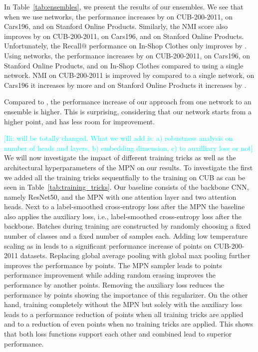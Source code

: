 \documentclass{article}
\newcommand{\ili}[1]{{\textcolor{cyan}{[Ili: #1]}}}
\begin{document}
\iffalse
CUB-200-2011 & 72.2 & 74.3 & 73.1 & 74.4 \\
Cars196 & 90.9 & 74.9 & 91.5 & 75.4 \\
Stanford Online Products & 81.8 & 92.7 & 82.1 & 92.8 \\
In-Shop Clothes & 92.9 & - & 93.4 &  \\
\fi 
In Table~\ref{tab:ensembles}, we present the results of our ensembles. We see that when we use  networks, the performance increases by  on CUB-200-2011,  on Cars196, and  on Stanford Online Products.  Similarly, the NMI score also improves by  on CUB-200-2011,  on Cars196, and  on Stanford Online Products. Unfortunately, the Recall@ performance on In-Shop Clothes only improves by .
Using  networks, the performance increases by  on CUB-200-2011,  on Cars196,  on Stanford Online Products, and  on In-Shop Clothes compared to using a single network. NMI on CUB-200-2011 is improved by  compared to a single network, on Cars196 it increases by  more and on Stanford Online Products it increases by .

Compared to \cite{DBLP:conf/eccv/GrLoss}, the performance increase of our approach from one network to an ensemble is higher. This is surprising, considering that our network starts from a higher point, and has less room for improvement.
\noindent

\iffalse
\ili{will be totally changed. What we will add is: a) robustness analysis on number of heads and layers, b) embedding dimension, c) to auxilliary loss or not}
We will now investigate the impact of different training tricks as well as the architectural hyperparameters of the MPN on our results. To investigate the first we added all the training tricks sequentfially to the training on CUB as can be seen in Table~\ref{tab:training_tricks}. Our baseline consists of the backbone CNN, namely ResNet50, and the MPN with one attention layer and two attention heads. Next to a label-smoothed cross-entropy loss after the MPN the baseline also applies the auxiliary loss, i.e., label-smoothed cross-entropy loss after the backbone. Batches during training are constructed by randomly choosing a fixed number of classes and a fixed number of samples each. Adding low temperature scaling as in \cite{DBLP:journals/corr/abs-1811-12649;DBLP:journals/corr/abs-2004-01113} leads to a significant performance increase of  points on CUB-200-2011 datasets. Replacing global average pooling with global max pooling further improves the performance by  points.
The MPN sampler leads to  points performance improvement while adding random erasing \cite{DBLP:conf/aaai/Zhong0KL020} improves the performance by another  points. Removing the auxiliary loss reduces the performance by  points showing the importance of this regularizer. On the other hand, training completely without the MPN but solely with the auxiliary loss leads to a performance reduction of  points when all training tricks are applied and to a reduction of even  points when no training tricks are applied. This shows that both loss functions support each other and combined lead to superior performance.
\end{document}
